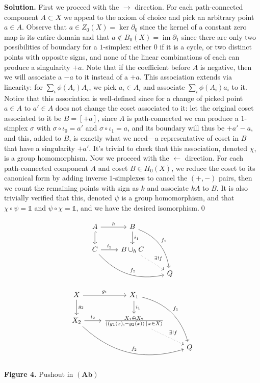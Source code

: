 \documentclass[10pt]{article}
\begin{document}
\begin{CJK*}{UTF8}{gbsn}
\textbf{Solution.} First we proceed with the $\rightarrow$ direction. For each path-connected component $A\subset X$ we appeal to the axiom of choice and pick an arbitrary point $a\in A$. Observe that $a\in Z_0(X)=\ker\partial_0$ since the kernel of a constant zero map is its entire domain and that $a\notin B_0(X)=\operatorname{im}\partial_1$ since there are only two possibilities of boundary for a $1$-simplex: either $0$ if it is a cycle, or two distinct points with opposite signs, and none of the linear combinations of each can produce a singularity $+a$. Note that if the coefficient before $A$ is negative, then we will associate a $-a$ to it instead of a $+a$. This association extends via linearity: for $\sum_i\phi(A_i)A_i$, we pick $a_i\in A_i$ and associate $\sum_i\phi(A_i)a_i$ to it. Notice that this association is well-defined since for a change of picked point $a\in A$ to $a'\in A$ does not change the coset associated to it: let the original coset associated to it be $B=[+a]$, since $A$ is path-connected we can produce a $1$-simplex $\sigma$ with $\sigma\circ\iota_0=a'$ and $\sigma\circ\iota_1=a$, and its boundary will thus be $+a'-a$, and this, added to $B$, is exactly what we need---a representative of coset in $B$ that have a singularity $+a'$. It's trivial to check that this association, denoted $\chi$, is a group homomorphism. Now we proceed with the $\leftarrow$ direction. For each path-connected component $A$ and coset $B\in H_0(X)$, we reduce the coset to its canonical form by adding inverse $1$-simplexes to cancel the $(+,-)$ pairs, then we count the remaining points with sign as $k$ and associate $kA$ to $B$. It is also trivially verified that this, denoted $\psi$ is a group homomorphism, and that $\chi\circ\psi=\mathbb{1}$ and $\psi\circ\chi=\mathbb{1}$, and we have the desired isomorphism.\qed

$$
\begin{tikzcd}
A\arrow[r,"h"]\arrow[d,hook]&B\arrow[d,"i_1"]\arrow[ddr,bend left,"f_1"]\\C\arrow[r,"i_2"]\arrow[drr,bend right,"f_2"]&B\cup_hC\arrow[dr,dotted,"{\exists!f}"]\\&&Q
\end{tikzcd}
$$

$$
\begin{tikzcd}
X\arrow[r,"g_1"]\arrow[d,"g_2"]&X_1\arrow[d,"i_1"]\arrow[ddr,bend left,"f_1"]\\X_2\arrow[r,"i_2"]\arrow[drr,bend right,"f_2"]&\frac{X_{1} \oplus X_{2}}{\left\langle (g_{1}(x),-g_{2}(x))\, | \,x \in X\right\rangle}\arrow[dr,dotted,"{\exists!f}"]\\&&Q
\end{tikzcd}
$$
\begin{center}\textbf{Figure 4.} Pushout in $(\mathbf{Ab})$\end{center}


\end{CJK*}
\end{document}
